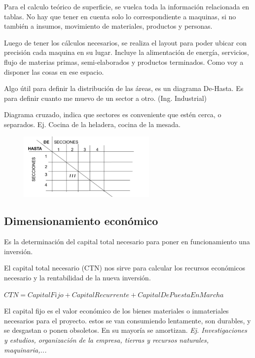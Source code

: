 \documentclass[titlepage,a4paper]{article}
\begin{document}
Para el calculo teórico de superficie, se vuelca toda la información relacionada en tablas. No hay que tener en cuenta solo lo correspondiente a maquinas, si no también a insumos, movimiento de materiales, productos y personas.

Luego de tener los cálculos necesarios, se realiza el layout para poder ubicar con precisión cada maquina en su lugar. Incluye la alimentación de energía, servicios, flujo de materias primas, semi-elaborados y productos terminados. Como voy a disponer las cosas en ese espacio.


Algo útil para definir la distribución de las áreas, es un diagrama De-Hasta. Es para definir cuanto me muevo de un sector a otro. (Ing. Industrial)

Diagrama cruzado, indica que sectores es conveniente que estén cerca, o separados. Ej. Cocina de la heladera, cocina de la mesada.

\begin{figure}[!htb]
    \centering
    \includegraphics[width=0.6\textwidth]{imagenes/DistribucionOficinas.PNG}
\end{figure}

\newpage

\subsection{Dimensionamiento económico}
Es la determinación del capital total necesario para poner en funcionamiento una inversión.

El capital total necesario (CTN) nos sirve para calcular los recursos económicos necesario y la rentabilidad de la nueva inversión.

\begin{math}
CTN = CapitalFijo + CapitalRecurrente + CapitalDePuestaEnMarcha
\end{math}

El capital fijo es el valor económico de los bienes materiales o inmateriales necesarios para el proyecto. estos se van consumiendo lentamente, son durables, y se desgastan o ponen obsoletos. En su mayoría se amortizan. \textit{Ej. Investigaciones y estudios, organización de la empresa, tierras y recursos naturales, maquinaria,...}
\end{document}
